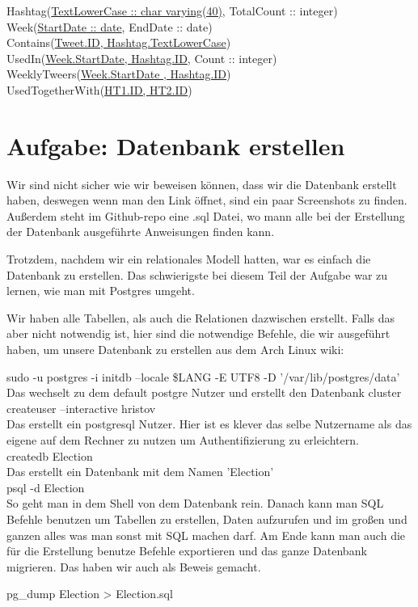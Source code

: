 Hashtag(\underline{TextLowerCase :: char varying(40)}, TotalCount :: integer) \\
Week(\underline{StartDate :: date}, EndDate :: date) \\

Contains(\underline{Tweet.ID, Hashtag.TextLowerCase}) \\
UsedIn(\underline{Week.StartDate, Hashtag.ID}, Count :: integer) \\
WeeklyTweers(\underline{Week.StartDate , Hashtag.ID}) \\ 
UsedTogetherWith(\underline{HT1.ID, HT2.ID}) \\



\section{Aufgabe: Datenbank erstellen}
Wir sind nicht sicher wie wir beweisen können, dass wir die Datenbank erstellt haben, deswegen wenn man den Link öffnet, 
sind ein paar Screenshots zu finden. Außerdem steht im Github-repo eine .sql Datei, wo mann alle bei der Erstellung der Datenbank
ausgeführte Anweisungen finden kann. 

Trotzdem, nachdem wir ein relationales Modell hatten, war es einfach die Datenbank zu erstellen. Das schwierigste bei diesem Teil
der Aufgabe war zu lernen, wie man mit Postgres umgeht.

Wir haben alle Tabellen, als auch die Relationen dazwischen erstellt. Falls das aber nicht notwendig ist, hier sind die notwendige Befehle, die wir ausgeführt haben, um unsere Datenbank zu erstellen aus dem Arch Linux wiki:

sudo -u postgres -i
initdb --locale \$LANG -E UTF8 -D '/var/lib/postgres/data' \\

Das wechselt zu dem default postgre Nutzer und erstellt den Datenbank cluster \\

createuser --interactive hristov \\

Das erstellt ein postgresql Nutzer. Hier ist es klever das selbe Nutzername als das eigene auf dem Rechner zu nutzen um Authentifizierung zu erleichtern. \\

createdb Election \\

Das erstellt ein Datenbank mit dem Namen 'Election' \\

psql -d Election \\

So geht man in dem Shell von dem Datenbank rein. Danach kann man SQL Befehle benutzen um 
Tabellen zu erstellen, Daten aufzurufen und im großen und ganzen alles was man sonst mit SQL machen darf. Am Ende kann man auch die für die Erstellung benutze Befehle exportieren und das ganze Datenbank migrieren. Das haben wir auch als Beweis gemacht.

pg\_dump Election > Election.sql



